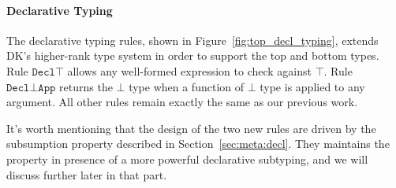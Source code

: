 \paragraph{Declarative Typing}

The declarative typing rules, shown in Figure~\ref{fig:top_decl_typing},
extends DK's higher-rank type system in order to support the top and bottom types.
Rule $\mathtt{Decl\top}$ allows any well-formed expression to check against $\top$.
Rule $\mathtt{Decl{\bot}App}$ returns the $\bot$ type
when a function of $\bot$ type is applied to any argument.
All other rules remain exactly the same as our previous work.

It's worth mentioning that the design of the two new rules
are driven by the subsumption property described in Section~\ref{sec:meta:decl}.
They maintains the property in presence of a more powerful declarative subtyping,
and we will discuss further later in that part.

\setcounter{algRuleCounter}{0}
